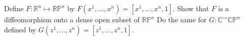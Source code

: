 Define $F:\mathbb{R}^n \mapsto \mathbb{RP}^n$ by $F(x^1, \ldots, x^n) = [x^1, \ldots, x^n, 1]$.  Show that $F$ is a diffeomorphism onto a dense open subset of $\mathbb{RP}^n$  Do the same for $G:\mathbb{C}^\mapsto\mathbb{CP}^n$ defined by $G(z^1, \ldots, z^n) = [z^1, \ldots, z^n, 1]$.
